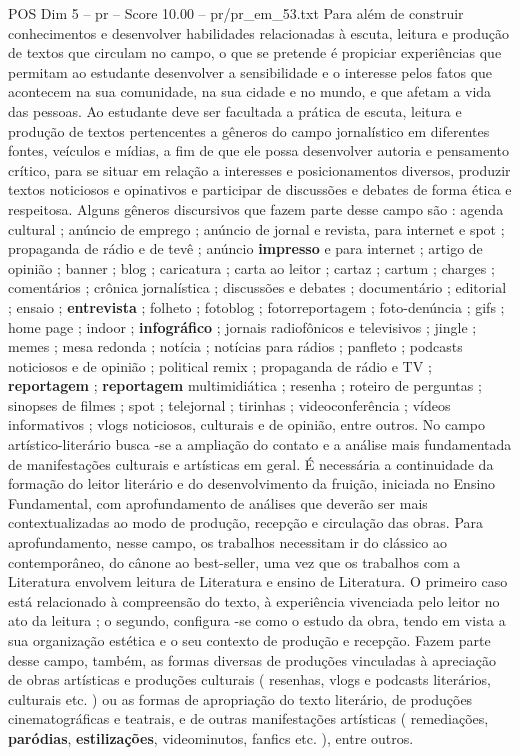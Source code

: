 \begin{textsample}{POS Dim 5 – pr – Score 10.00 – pr/pr\_em\_53.txt}
Para além de construir conhecimentos e desenvolver habilidades relacionadas à escuta, leitura e produção de textos que circulam no campo, o que se pretende é propiciar experiências que permitam ao estudante desenvolver a sensibilidade e o interesse pelos fatos que acontecem na sua comunidade, na sua cidade e no mundo, e que afetam a vida das pessoas.
Ao estudante deve ser facultada a prática de escuta, leitura e produção de textos pertencentes a gêneros do campo jornalístico em diferentes fontes, veículos e mídias, a fim de que ele possa desenvolver autoria e pensamento crítico, para se situar em relação a interesses e posicionamentos diversos, produzir textos noticiosos e opinativos e participar de discussões e debates de forma ética e respeitosa.
Alguns gêneros discursivos que fazem parte desse campo são : agenda cultural ; anúncio de emprego ; anúncio de jornal e revista, para internet e spot ; propaganda de rádio e de tevê ; anúncio \textbf{impresso} e para internet ; artigo de opinião ; banner ; blog ; caricatura ; carta ao leitor ; cartaz ; cartum ; charges ; comentários ; crônica jornalística ; discussões e debates ; documentário ; editorial ; ensaio ; \textbf{entrevista} ; folheto ; fotoblog ; fotorreportagem ; foto-denúncia ; gifs ; home page ; indoor ; \textbf{infográfico} ; jornais radiofônicos e televisivos ; jingle ; memes ; mesa redonda ; notícia ; notícias para rádios ; panfleto ; podcasts noticiosos e de opinião ; political remix ; propaganda de rádio e TV ; \textbf{reportagem} ; \textbf{reportagem} multimidiática ; resenha ; roteiro de perguntas ; sinopses de filmes ; spot ; telejornal ; tirinhas ; videoconferência ; vídeos informativos ; vlogs noticiosos, culturais e de opinião, entre outros.
No campo artístico-literário busca -se a ampliação do contato e a análise mais fundamentada de manifestações culturais e artísticas em geral.
É necessária a continuidade da formação do leitor literário e do desenvolvimento da fruição, iniciada no Ensino Fundamental, com aprofundamento de análises que deverão ser mais contextualizadas ao modo de produção, recepção e circulação das obras.
Para aprofundamento, nesse campo, os trabalhos necessitam ir do clássico ao contemporâneo, do cânone ao best-seller, uma vez que os trabalhos com a Literatura envolvem leitura de Literatura e ensino de Literatura.
O primeiro caso está relacionado à compreensão do texto, à experiência vivenciada pelo leitor no ato da leitura ; o segundo, configura -se como o estudo da obra, tendo em vista a sua organização estética e o seu contexto de produção e recepção.
Fazem parte desse campo, também, as formas diversas de produções vinculadas à apreciação de obras artísticas e produções culturais ( resenhas, vlogs e podcasts literários, culturais etc. ) ou as formas de apropriação do texto literário, de produções cinematográficas e teatrais, e de outras manifestações artísticas ( remediações, \textbf{paródias}, \textbf{estilizações}, videominutos, fanfics etc. ), entre outros.

\end{textsample}
